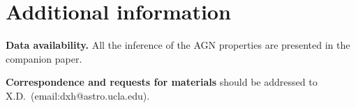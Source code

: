 \documentclass{natureprintstyle}
\newcommand{\lenstronomy}{{\sc Lenstronomy}}
\newcommand{\sam}{\texttt{SAM}}
\begin{document}
\section*{Additional information}

\textbf{Data availability.} All the inference of the AGN properties are presented in the companion paper.

\textbf{Correspondence and requests for materials} should be addressed to X.D.~(email:dxh@astro.ucla.edu).



%
%
\end{document}

